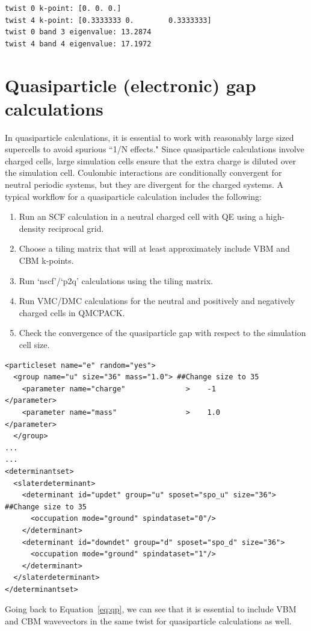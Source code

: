 \begin{lstlisting}[style=Python]
twist 0 k-point: [0. 0. 0.]
twist 4 k-point: [0.3333333 0.        0.3333333]
twist 0 band 3 eigenvalue: 13.2874
twist 4 band 4 eigenvalue: 17.1972
\end{lstlisting}

\section{Quasiparticle (electronic) gap calculations}\label{sec:lab_ex_qp}
In quasiparticle calculations, it is essential to work with reasonably large sized supercells to avoid spurious ``1/N effects." 
Since quasiparticle calculations involve charged cells, large simulation cells ensure that the extra charge is diluted over the simulation cell. Coulombic interactions are conditionally convergent for neutral periodic systems, but they are divergent for the charged systems. 
A typical workflow for a quasiparticle calculation includes the following:
\begin{enumerate}
	\item Run an SCF calculation in a neutral charged cell with QE using a high-density reciprocal grid.
	\item Choose a tiling matrix that will at least approximately include VBM and CBM k-points. 
	\item Run `nscf'/`p2q' calculations using the tiling matrix. 
	\item Run VMC/DMC calculations for the neutral and positively and negatively charged cells in QMCPACK.
	\item Check the convergence of the quasiparticle gap with respect to the simulation cell size.
\end{enumerate}
\begin{lstlisting}[style=QMCPXML]
<particleset name="e" random="yes">
  <group name="u" size="36" mass="1.0"> ##Change size to 35
    <parameter name="charge"              >    -1                    </parameter>
    <parameter name="mass"                >    1.0                   </parameter>
  </group>
...
...
<determinantset>
  <slaterdeterminant>
    <determinant id="updet" group="u" sposet="spo_u" size="36"> ##Change size to 35
      <occupation mode="ground" spindataset="0"/>	
    </determinant>
    <determinant id="downdet" group="d" sposet="spo_d" size="36">
      <occupation mode="ground" spindataset="1"/>	
    </determinant>
  </slaterdeterminant>
</determinantset>
\end{lstlisting}
Going back to Equation~\ref{eq:qp}, we can see that it is essential to include VBM and CBM wavevectors in the same twist for quasiparticle calculations as well. 

